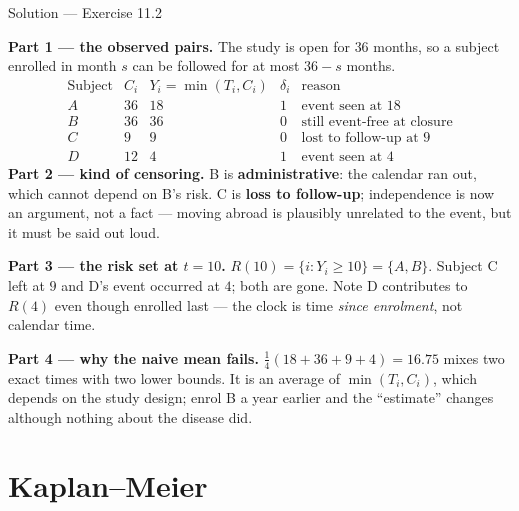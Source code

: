 \documentclass[aspectratio=169,11pt]{beamer}
\begin{document}
\begin{frame}{Solution --- Exercise 11.2}
  \footnotesize
\begin{solutionbox}
  \scriptsize
  \textbf{Part 1 --- the observed pairs.} The study is open for $36$ months, so a subject
  enrolled in month $s$ can be followed for at most $36-s$ months.
  \[
    \begin{array}{c|c|c|c|l}
      \text{Subject} & C_i & Y_i=\min(T_i,C_i) & \delta_i & \text{reason}\\ \hline
      A & 36 & 18 & 1 & \text{event seen at }18 \\
      B & 36 & 36 & 0 & \text{still event-free at closure}\\
      C & 9  & 9  & 0 & \text{lost to follow-up at }9\\
      D & 12 & 4  & 1 & \text{event seen at }4
    \end{array}
  \]
  \textbf{Part 2 --- kind of censoring.} B is \textbf{administrative}: the calendar ran
  out, which cannot depend on B's risk. C is \textbf{loss to follow-up}; independence is
  now an argument, not a fact --- moving abroad is plausibly unrelated to the event, but
  it must be said out loud.

  \medskip
  \textbf{Part 3 --- the risk set at $t=10$.} $R(10)=\{i: Y_i\ge 10\}=\{A,B\}$. Subject C
  left at $9$ and D's event occurred at $4$; both are gone. Note D contributes to $R(4)$
  even though enrolled last --- the clock is time \emph{since enrolment}, not calendar time.

  \medskip
  \textbf{Part 4 --- why the naive mean fails.} $\tfrac14(18+36+9+4)=16.75$ mixes two exact
  times with two lower bounds. It is an average of $\min(T_i,C_i)$, which depends on the
  study design; enrol B a year earlier and the ``estimate'' changes although nothing about
  the disease did.
\end{solutionbox}
\end{frame}

\section{Kaplan--Meier}
\end{document}
